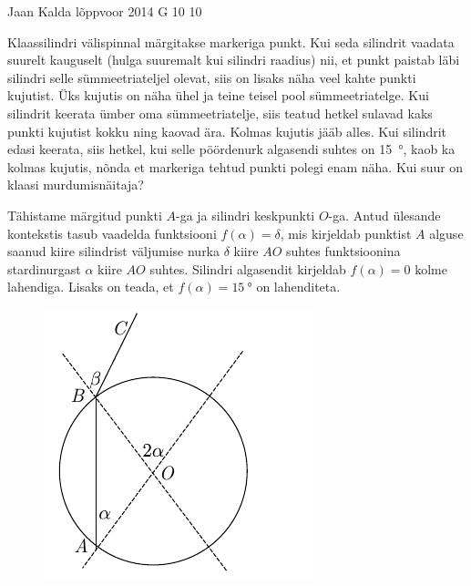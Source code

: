 {Jaan Kalda} %
{lõppvoor} %
{2014} %
{G 10} %
{10} %
{
\ifStatement
Klaassilindri välispinnal märgitakse markeriga punkt. Kui seda silindrit vaadata suurelt kauguselt (hulga suuremalt kui silindri raadius) nii, et punkt paistab läbi silindri selle sümmeetriateljel olevat, siis on lisaks näha veel kahte punkti kujutist. Üks kujutis on näha ühel ja teine teisel pool sümmeetriatelge. Kui silindrit keerata ümber oma sümmeetriatelje, siis teatud hetkel sulavad kaks punkti kujutist kokku ning kaovad ära. Kolmas kujutis jääb alles. Kui silindrit edasi keerata, siis hetkel, kui selle pöördenurk algasendi suhtes on \SI{15}{\degree}, kaob ka kolmas kujutis, nõnda et markeriga tehtud punkti polegi enam näha. Kui suur on klaasi murdumisnäitaja?
\fi


\ifHint
Tähistame märgitud punkti $A$-ga ja silindri keskpunkti $O$-ga. Antud ülesande kontekstis tasub vaadelda funktsiooni $f(\alpha) = \delta$, mis kirjeldab punktist $A$ alguse saanud kiire silindrist väljumise nurka $\delta$ kiire $AO$ suhtes funktsioonina stardinurgast $\alpha$ kiire $AO$ suhtes. Silindri algasendit kirjeldab $f(\alpha) = 0$ kolme lahendiga. Lisaks on teada, et $f(\alpha) = \SI{15}{\degree}$ on lahenditeta.
\fi


\ifSolution
\begin{figure}%
\includegraphics[trim = 0mm 0mm 12mm 0mm, clip, width=1\linewidth]{2014-v3g-10-silinder}
\end{figure}

}
